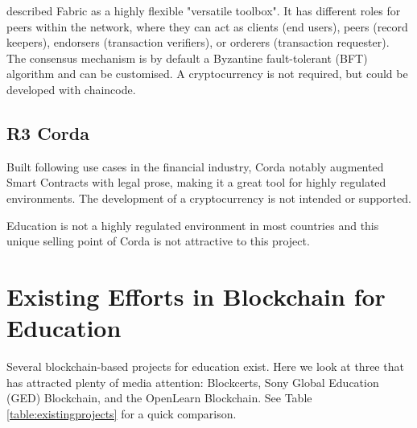 \citet[p.7]{valenta2017comparison} described Fabric as a highly flexible "versatile toolbox". It
has different roles for peers within the network, where they can act as clients (end users), peers
(record keepers), endorsers (transaction verifiers), or orderers (transaction requester). The
consensus mechanism is by default a Byzantine fault-tolerant (BFT) algorithm and can be customised.
A cryptocurrency is not required, but could be developed with chaincode.

\subsection*{R3 Corda}

Built following use cases in the financial industry, Corda notably augmented Smart Contracts
with legal prose, making it a great tool for highly regulated environments. The development of
a cryptocurrency is not intended or supported. \citep{valenta2017comparison}

Education is not a highly regulated environment in most countries and this unique selling point of
Corda is not attractive to this project.

\section{Existing Efforts in Blockchain for Education}


Several blockchain-based projects for education exist. Here we look at three that has attracted plenty of media attention:
Blockcerts, Sony Global Education (GED) Blockchain, and the OpenLearn Blockchain. See Table \ref{table:existingprojects} for a quick comparison.

